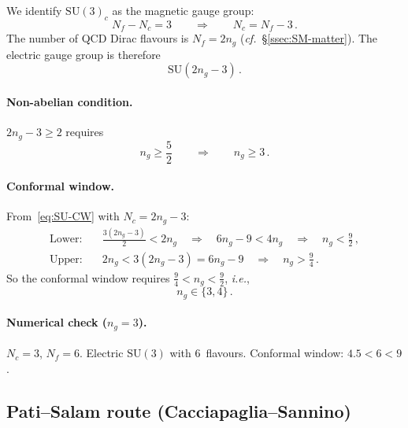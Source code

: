 \documentclass[11pt,a4paper]{article}
\theoremstyle{plain}
\theoremstyle{definition}
\theoremstyle{remark}
\newcommand{\Nc}{N_{\!c}}
\newcommand{\Nf}{N_{\!f}}
\newcommand{\ngen}{n_g}
\newcommand{\SU}[1]{\mathrm{SU}(#1)}
\newcommand{\ie}{\textit{i.e.}}
\newcommand{\cf}{\textit{cf.}}
\begin{document}
We identify $\SU{3}_c$ as the magnetic gauge group:
\begin{equation}\label{eq:SU-magnetic}
  \Nf - \Nc = 3
  \qquad\Longrightarrow\qquad
  \Nc = \Nf - 3\,.
\end{equation}
The number of QCD Dirac flavours is $\Nf = 2\ngen$
(\cf~\S\ref{ssec:SM-matter}).  The electric gauge group is therefore
\begin{equation}\label{eq:SU-electric}
  \boxed{\SU{2\ngen - 3}}\,.
\end{equation}

\paragraph{Non-abelian condition.}
$2\ngen - 3 \geq 2$ requires
\begin{equation}\label{eq:SU-bound}
  \boxed{\ngen \geq \frac{5}{2}
  \qquad\Longrightarrow\qquad \ngen \geq 3}\,.
\end{equation}

\paragraph{Conformal window.}
From~\eqref{eq:SU-CW} with $\Nc = 2\ngen - 3$:
\begin{align}
  \text{Lower:}&\quad \frac{3(2\ngen - 3)}{2} < 2\ngen
  \quad\Longrightarrow\quad
  6\ngen - 9 < 4\ngen
  \quad\Longrightarrow\quad
  \ngen < \frac{9}{2}\,,
  \label{eq:SU-CW-lower} \\
  \text{Upper:}&\quad 2\ngen < 3(2\ngen - 3) = 6\ngen - 9
  \quad\Longrightarrow\quad
  \ngen > \frac{9}{4}\,.
  \label{eq:SU-CW-upper}
\end{align}
So the conformal window requires $\frac{9}{4} < \ngen < \frac{9}{2}$,
\ie,
\begin{equation}\label{eq:SU-CW-ng}
  \ngen \in \{3, 4\}\,.
\end{equation}

\paragraph{Numerical check ($\ngen = 3$).}
$\Nc = 3$, $\Nf = 6$.  Electric $\SU{3}$ with 6~flavours.
Conformal window: $4.5 < 6 < 9$.  \checkmark

\subsection{Pati--Salam route (Cacciapaglia--Sannino)}
\label{ssec:pati-salam}
\end{document}
